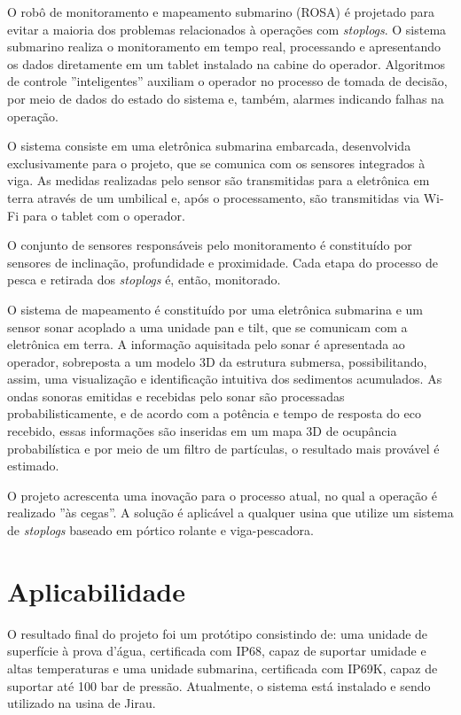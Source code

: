 O robô de monitoramento e mapeamento submarino (ROSA) é projetado para evitar a
maioria dos problemas relacionados à operações com \textit{stoplogs}. O sistema
submarino realiza o monitoramento em tempo real, processando e apresentando os
dados diretamente em um tablet instalado na cabine do operador. Algoritmos de
controle ''inteligentes'' auxiliam o operador no processo de tomada de decisão,
por meio de dados do estado do sistema e, também, alarmes indicando falhas na
operação.

O sistema consiste em uma eletrônica submarina embarcada, desenvolvida
exclusivamente para o projeto, que se comunica com os sensores integrados à
viga. As medidas realizadas pelo sensor são transmitidas para a
eletrônica em terra através de um umbilical e, após o processamento, são
transmitidas via Wi-Fi para o tablet com o operador.

O conjunto de sensores responsáveis pelo monitoramento é constituído por
sensores de inclinação, profundidade e proximidade. Cada etapa do processo de
pesca e retirada dos \textit{stoplogs} é, então, monitorado.

O sistema de mapeamento é constituído por uma eletrônica submarina e um sensor
sonar acoplado a uma unidade pan e tilt, que se comunicam com a eletrônica em
terra.
A informação aquisitada pelo sonar é apresentada ao operador, sobreposta a um 
modelo 3D da estrutura submersa, possibilitando, assim, uma
visualização e identificação intuitiva dos sedimentos acumulados.
As ondas sonoras emitidas e recebidas pelo sonar são processadas 
probabilisticamente, e de acordo com a potência e tempo de resposta
do eco recebido, essas informações são inseridas em um mapa 3D de ocupância
probabilística e por meio de um filtro de partículas, o resultado mais provável
é estimado.

O projeto acrescenta uma inovação para o processo atual, no qual a operação é
realizado ''às cegas''. A solução é aplicável a qualquer usina que utilize um
sistema de \textit{stoplogs} baseado em pórtico rolante e viga-pescadora.


\section{Aplicabilidade}

O resultado final do projeto foi um protótipo consistindo de: uma unidade de
superfície à prova d'água, certificada com IP68, capaz de suportar umidade e
altas temperaturas e uma unidade submarina, certificada com IP69K, capaz de
suportar até 100 bar de pressão. Atualmente, o sistema está instalado e sendo
utilizado na usina de Jirau.

